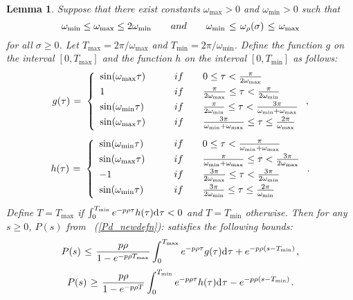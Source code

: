 \documentclass[12pt]{article}
\newtheorem{lemma}[theorem]{Lemma}
\theoremstyle{definition}
\numberwithin{equation}{section}                        %
\newcommand{\BE}{\begin{equation}}
\newcommand{\BEQ}[1]{\BE\mathlabel{#1}} %
\newcommand{\rfb}[1]{\mbox{\rm
   (\ref{#1})}\ifx\undefined\stillediting\else:\fbox{$#1$}\fi}
\newcommand{\m}      {{\hbox{\hskip 1pt}}}
\renewcommand{\o}    {{\omega}}
\newcommand{\dd}     {{\rm d\hbox{\hskip 0.5pt}}}
\let\oldlabel=\label
\renewcommand{\label}[1]{\leavevmode\smash{\raise 10pt\llap
             {\fbox{\scriptsize#1}}}\oldlabel{#1}}
\newcommand{\mathlabel}[1]{\smash{\raise 9pt\llap
             {\scriptsize(#1)}}\label{#1}}
\renewcommand{\label}[1]{\oldlabel{#1}}
\renewcommand{\mathlabel}[1]{\label{#1}}
\begin{document}
\begin{lemma} \label{bound}
Suppose that there exist constants $\o_{\max}>0$ and $\o_{\min}>0$
such that
\BEQ{omega_rel}
  \o_{\min}\leq\o_{\max}\leq2\o_{\min} \qquad and\qquad \o_{\min}
  \m\leq\m\o_{\rho}(\sigma)\m\leq\m\o_{\max}
\end{equation}
for all $\sigma\geq0$. Let $T_{\max}=2\pi/\o_{\max}$ and $T_{\min}=
2\pi/\o_{\min}$. Define the function $g$ on the interval $[0,T_{\max}]$
and the function $h$ on the interval $[0,T_{\min}]$ as follows\m:
\BEQ{g_defn}
  g(\tau) \m=\m \left\{
   \begin{array}{l l}
      \vspace{1mm} \sin(\o_{\max}\tau) \qquad& if \qquad 0\leq\tau<
      \frac{\pi} {2\o_{\max}}\\
      \vspace{1mm} 1 \qquad& if \qquad \frac{\pi}{2\o_{\max}}\leq
      \tau<\frac{\pi} {2\o_{\min}}\\
      \vspace{1mm} \sin(\o_{\min}\tau) \qquad& if \qquad\frac{\pi}
      {2\o_{\min}}\leq\tau<\frac{3\pi}{\o_{\min}+\o_{\max}}\\
      \vspace{1mm} \sin(\o_{\max}\tau)\qquad& if \qquad\frac{3\pi}
      {\o_{\min}+\o_{\max}}\leq\tau\leq\frac{2\pi}{\o_{\max}}
  \end{array} \right. ,
\end{equation}
\BEQ{h_defn}
  h(\tau) \m=\m \left\{
   \begin{array}{l l}
      \vspace{1mm} \sin(\o_{\min}\tau) \qquad& if \qquad 0\leq\tau<
      \frac{\pi}{\o_{\min}+\o_{\max}}\\
      \vspace{1mm} \sin(\o_{\max}\tau) \qquad& if \qquad \frac{\pi}
      {\o_{\min}+\o_{\max}} \leq\tau<\frac{3\pi} {2\o_{\max}}\\
      \vspace{1mm} -1 \qquad& if \qquad\frac{3\pi}{2\o_{\max}}\leq
      \tau<\frac{3\pi}{2\o_{\min}}\\
      \vspace{1mm} \sin(\o_{\min}\tau) \qquad& if \qquad \frac{3\pi}
      {2\o_{\min}}\leq\tau\leq\frac{2\pi}{\o_{\min}}
  \end{array} \right. .
\end{equation}
Define $T=T_{\max}$ if $\int_0^{T_{\min}} e^{-p\rho\tau}h(\tau)\dd
\tau<0$ and $T=T_{\min}$ otherwise. Then for any $s\geq 0$, $P(s)$
from \rfb{Pd_newdefn} satisfies the following bounds\m:
\BEQ{UB_eqn}
  P(s) \m\leq\m \frac{p\rho}{1-e^{-p\rho T_{\max}}} \int_0^{T_
  {\max}} e^{-p\rho\tau} g(\tau)\dd\tau + e^{-p\rho(s-T_{\min})} \m,
\end{equation}
\BEQ{LB_eqn}
  P(s) \m\geq\m \frac{p\rho}{1-e^{-p\rho T}} \int_0^{T_{\min}}
  e^{-p\rho\tau}h(\tau)\dd\tau - e^{-p\rho(s-T_{\min})} \m.
\end{equation}
\end{lemma}
\end{document}
